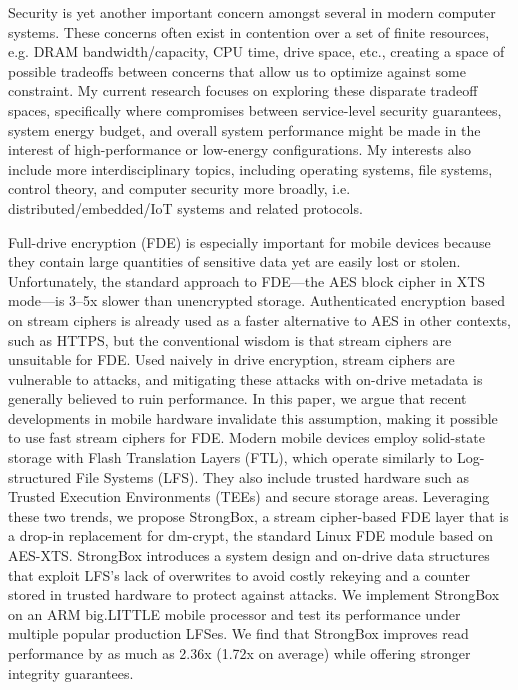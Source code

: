 Security is yet another important concern amongst several in modern computer
systems. These concerns often exist in contention over a set of finite
resources, e.g. DRAM bandwidth/capacity, CPU time, drive space, etc., creating a
space of possible tradeoffs between concerns that allow us to optimize against
some constraint. My current research focuses on exploring these disparate
tradeoff spaces, specifically where compromises between service-level security
guarantees, system energy budget, and overall system performance might be made
in the interest of high-performance or low-energy configurations. My interests
also include more interdisciplinary topics, including operating systems, file
systems, control theory, and computer security more broadly, i.e.
distributed/embedded/IoT systems and related protocols.

Full-drive encryption (FDE) is especially important for mobile devices because
they contain large quantities of sensitive data yet are easily lost or stolen.
Unfortunately, the standard approach to FDE---the AES block cipher in XTS
mode---is 3--5x slower than unencrypted storage. Authenticated encryption based
on stream ciphers is already used as a faster alternative to AES in other
contexts, such as HTTPS, but the conventional wisdom is that stream ciphers are
unsuitable for FDE. Used naively in drive encryption, stream ciphers are
vulnerable to attacks, and mitigating these attacks with on-drive metadata is
generally believed to ruin performance. In this paper, we argue that recent
developments in mobile hardware invalidate this assumption, making it possible
to use fast stream ciphers for FDE. Modern mobile devices employ solid-state
storage with Flash Translation Layers (FTL), which operate similarly to
Log-structured File Systems (LFS). They also include trusted hardware such as
Trusted Execution Environments (TEEs) and secure storage areas. Leveraging these
two trends, we propose StrongBox, a stream cipher-based FDE layer that is a
drop-in replacement for dm-crypt, the standard Linux FDE module based on
AES-XTS. StrongBox introduces a system design and on-drive data structures that
exploit LFS's lack of overwrites to avoid costly rekeying and a counter stored
in trusted hardware to protect against attacks. We implement StrongBox on an ARM
big.LITTLE mobile processor and test its performance under multiple popular
production LFSes. We find that StrongBox improves read performance by as much as
2.36x (1.72x on average) while offering stronger integrity guarantees.
